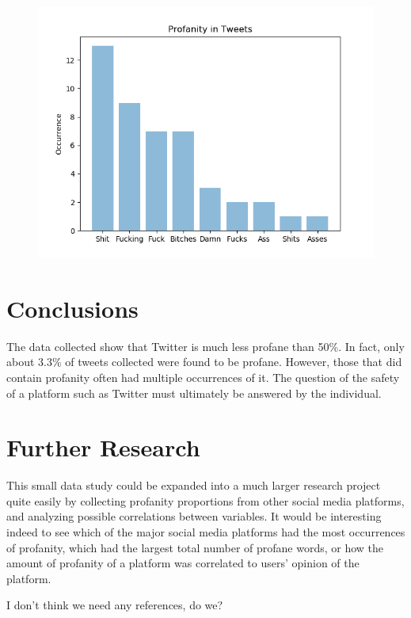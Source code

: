 \documentclass{article}
\begin{document}
\begin{figure}[h]
	\includegraphics[scale=1]{Figure_2}
\end{figure}

\section{Conclusions}
\tab The data collected show that Twitter is much less profane than 50\%. In fact, only about 3.3\% of tweets collected were found to be profane. However, those that did contain profanity often had multiple occurrences of it. The question of the safety of a platform such as Twitter must ultimately be answered by the individual.

\section{Further Research}
\tab This small data study could be expanded into a much larger research project quite easily by collecting profanity proportions from other social media platforms, and analyzing possible correlations between variables. It would be interesting indeed to see which of the major social media platforms had the most occurrences of profanity, which had the largest total number of profane words, or how the amount of profanity of a platform was correlated to users' opinion of the platform. 

\newpage
\begin{thebibliography}{}
	I don't think we need any references, do we?

	
	
\end{thebibliography}
\end{document}
